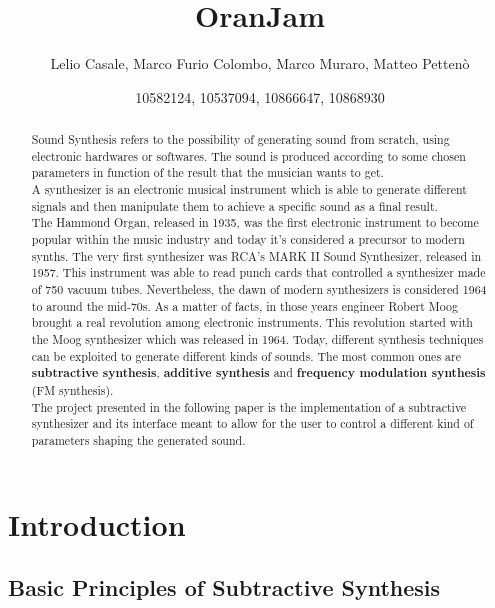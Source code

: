 \documentclass{article}
\title{OranJam}
\author{Lelio Casale, Marco Furio Colombo, Marco Muraro, Matteo Pettenò }
\date{10582124, 10537094, 10866647, 10868930}
\begin{document}
\maketitle

\begin{abstract}
Sound Synthesis refers to the possibility of generating sound from scratch, using electronic hardwares or softwares. The sound is produced according to some chosen parameters in function of the result that the musician wants to get.
\\A synthesizer is an electronic musical instrument which is able to generate different signals and then manipulate them to achieve a specific sound as a final result.
\\The Hammond Organ, released in 1935, was the first electronic instrument to become popular within the music industry and today it’s considered a precursor to modern synths. The very first synthesizer was RCA’s MARK II Sound Synthesizer, released in 1957. This instrument was able to read punch cards that controlled a synthesizer made of 750 vacuum tubes. Nevertheless, the dawn of modern synthesizers is considered 1964 to around the mid-70s. As a matter of facts, in those years engineer Robert Moog brought a real revolution among electronic instruments. This revolution started with the Moog synthesizer which was released in 1964.
Today, different synthesis techniques can be exploited to generate different kinds of sounds. The most common ones are \textbf{subtractive synthesis}, \textbf{additive synthesis} and \textbf{frequency modulation synthesis} (FM synthesis).
\\The project presented in the following paper is the implementation of a subtractive synthesizer and its interface meant to allow for the user to control a different kind of parameters shaping the generated sound.

\end{abstract}

\section{Introduction}

\subsection{Basic Principles of Subtractive Synthesis}
\end{document}
